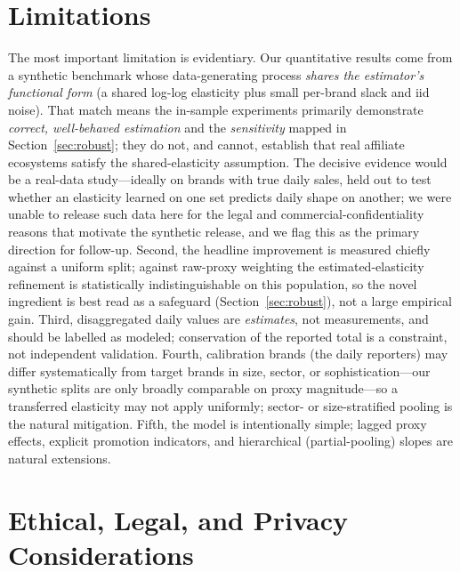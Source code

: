 \documentclass[11pt]{article}
\begin{document}
\section{Limitations}\label{sec:limitations}

The most important limitation is evidentiary. Our quantitative results come from
a synthetic benchmark whose data-generating process \emph{shares the estimator's
functional form} (a shared log-log elasticity plus small per-brand slack and iid
noise). That match means the in-sample experiments primarily demonstrate
\emph{correct, well-behaved estimation} and the \emph{sensitivity} mapped in
Section~\ref{sec:robust}; they do not, and cannot, establish that real affiliate
ecosystems satisfy the shared-elasticity assumption. The decisive evidence would
be a real-data study---ideally on brands with true daily sales, held out to test
whether an elasticity learned on one set predicts daily shape on another; we were
unable to release such data here for the legal and commercial-confidentiality
reasons that motivate the synthetic release, and we flag this as the primary
direction for follow-up. Second, the headline improvement is measured chiefly
against a uniform split; against raw-proxy weighting the estimated-elasticity
refinement is statistically indistinguishable on this population, so the novel
ingredient is best read as a safeguard (Section~\ref{sec:robust}), not a
large empirical gain. Third, disaggregated daily values are \emph{estimates},
not measurements, and should be labelled as modeled; conservation of the
reported total is a constraint, not independent validation. Fourth, calibration
brands (the daily reporters) may differ systematically from target brands in
size, sector, or sophistication---our synthetic splits are only broadly
comparable on proxy magnitude---so a transferred elasticity may not apply
uniformly; sector- or size-stratified pooling is the natural mitigation. Fifth,
the model is intentionally simple; lagged proxy effects, explicit promotion
indicators, and hierarchical (partial-pooling) slopes are natural extensions.

\section{Ethical, Legal, and Privacy Considerations}\label{sec:ethics}
\end{document}
